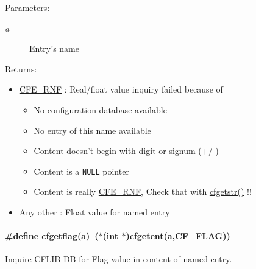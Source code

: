 \begin{Desc}
\item[Parameters:]
\begin{description}
\item[{\em a}]Entry's name\end{description}
\end{Desc}
\begin{Desc}
\item[Returns:]\begin{itemize}
\item \hyperlink{group__errors_g0415e4b197dc2908a58c026c4e621578}{CFE\_\-RNF} : Real/float value inquiry failed because of\begin{itemize}
\item No configuration database available\item No entry of this name available\item Content doesn't begin with digit or signum (+/-)\item Content is a {\tt NULL} pointer\item Content is really \hyperlink{group__errors_g0415e4b197dc2908a58c026c4e621578}{CFE\_\-RNF}, Check that with \hyperlink{group__retrieval_g8cf5f53c5b05ec5ca4f5145010f84eb4}{cfgetstr()} !!\end{itemize}
\end{itemize}
\begin{itemize}
\item Any other : Float value for named entry \end{itemize}
\end{Desc}
\hypertarget{group__retrieval_gc0188464b59267e14b5c44efb1d4a0f2}{
\paragraph[{cfgetflag}]{\setlength{\rightskip}{0pt plus 5cm}\#define cfgetflag(a)~($\ast$(int $\ast$)cfgetent(a,CF\_\-FLAG))}\hfill}
\label{group__retrieval_gc0188464b59267e14b5c44efb1d4a0f2}


Inquire CFLIB DB for Flag value in content of named entry. 

